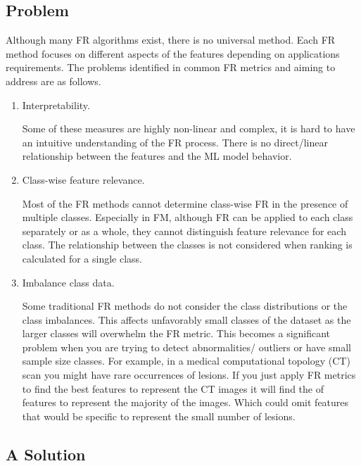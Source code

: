 \subsection{Problem}
Although many FR algorithms exist, there is no universal method. Each FR method focuses on different aspects of the features depending on applications requirements. The problems identified in common FR metrics and aiming to address are as follows.

\begin{enumerate}
    \item Interpretability.
    
    Some of these measures are highly non-linear and complex, it is hard to have an intuitive understanding of the FR process. There is no direct/linear relationship between the features and the ML model behavior.
    
    \item Class-wise feature relevance.
    
    Most of the FR methods cannot determine class-wise FR in the presence of multiple classes. Especially in FM, although FR can be applied to each class separately or as a whole, they cannot distinguish feature relevance for each class. The relationship between the classes is not considered when ranking is calculated for a single class.
    
    \item Imbalance class data.
    
    Some traditional FR methods do not consider the class distributions or the class imbalances. This affects unfavorably small classes of the dataset as the larger classes will overwhelm the FR metric. This becomes a significant problem when you are trying to detect abnormalities/ outliers or have small sample size classes. For example, in a medical computational topology (CT) scan you might have rare occurrences of lesions. If you just apply FR metrics to find the best features to represent the CT images it will find the  of features to represent the majority of the images. Which could omit features that would be specific to represent the small number of lesions.  
\end{enumerate}

\subsection{A Solution}

